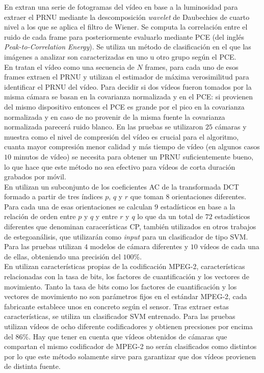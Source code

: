 En \cite{naveen:2016} extran una serie de fotogramas del vídeo en base a la luminosidad para extraer el PRNU mediante la descomposición \textit{wavelet} de Daubechies de cuarto nivel a los que se aplica el filtro de Wiener. Se computa la correlación entre el ruido de cada frame para posteriormente evaluarlo mediante PCE (del inglés \textit{Peak-to-Correlation Energy}). Se utiliza un método de clasificación en el que las imágenes a analizar son caracterizadas en uno u otro grupo según el PCE. \\

En \cite{chen:2007} tratan el vídeo como una secuencia de $N$ frames, para cada uno de esos frames extraen el PRNU y utilizan el estimador de máxima verosimilitud para identificar el PRNU del vídeo. Para decidir si dos vídeos fueron tomados por la misma cámara se basan en la covarianza normalizada y en el PCE: si provienen del mismo dispositivo entonces el PCE es grande por el pico en la covarianza normalizada y en caso de no provenir de la misma fuente la covarianza normalizada parecerá ruido blanco. En las pruebas se utilizaron $25$ cámaras y muestra como el nivel de compresión del vídeo es crucial para el algoritmo, cuanta mayor compresión menor calidad y más tiempo de vídeo (en algunos casos $10$ minutos de vídeo) se necesita para obtener un PRNU suficientemente bueno, lo que hace que este método no sea efectivo para vídeos de corta duración grabados por móvil. \\ 

En \cite{yahaya:2012} utilizan un subconjunto de los coeficientes AC de la transformada DCT formado a partir de tres índices $p$, $q$ y $r$ que toman $8$ orientaciones diferentes. Para cada una de esas orientaciones se calculan $9$ estadísticos en base a la relación de orden entre $p$ y $q$ y entre $r$ y $q$ lo que da un total de $72$ estadísticos diferentes que denominan caracerísticas CP, también utilizados en otros trabajos de estegoanálisis, que utilizarán como \textit{input} para un clasificador de tipo SVM. Para las pruebas utilizan $4$ modelos de cámara diferentes y $10$ vídeos de cada una de ellas, obteniendo una precisión del $100\%$. \\

En \cite{dong:2010} utilizan características propias de la codificación MPEG-2, características relacionadas con la tasa de bits, los factores de cuantificación y los vectores de movimiento. Tanto la tasa de bits como los factores de cuantificación y los vectores de movimiento no son parámetros fijos en el estándar MPEG-2, cada fabricante establece unos en concreto según el sensor. Tras extraer estas características, se utiliza un clasificador SVM entrenado. Para las pruebas utilizan vídeos de ocho diferente codificadores y obtienen precsiones por encima del $86\%$. Hay que tener en cuenta que vídeos obtenidos de cámaras que compartan el mismo codificador de MPEG-2 no serán clasificados como distintos por lo que este método solamente sirve para garantizar que dos vídeos provienen de distinta fuente. \\

